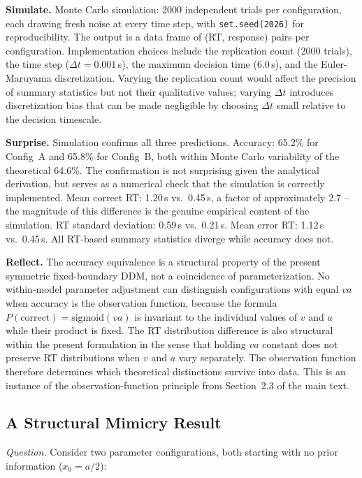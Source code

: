 \documentclass[11pt,a4paper]{article}
\begin{document}
\textbf{Simulate.} Monte Carlo simulation: 2000 independent trials per configuration, each drawing fresh noise at every time step, with \texttt{set.seed(2026)} for reproducibility. The output is a data frame of (RT, response) pairs per configuration. Implementation choices include the replication count (2000 trials), the time step ($\Delta t = 0.001$\,s), the maximum decision time ($6.0$\,s), and the Euler-Maruyama discretization. Varying the replication count would affect the precision of summary statistics but not their qualitative values; varying $\Delta t$ introduces discretization bias that can be made negligible by choosing $\Delta t$ small relative to the decision timescale.

\textbf{Surprise.} Simulation confirms all three predictions. Accuracy: 65.2\% for Config~A and 65.8\% for Config~B, both within Monte Carlo variability of the theoretical 64.6\%. The confirmation is not surprising given the analytical derivation, but serves as a numerical check that the simulation is correctly implemented. Mean correct RT: 1.20\,s vs.\ 0.45\,s, a factor of approximately 2.7 -- the magnitude of this difference is the genuine empirical content of the simulation. RT standard deviation: 0.59\,s vs.\ 0.21\,s. Mean error RT: 1.12\,s vs.\ 0.45\,s. All RT-based summary statistics diverge while accuracy does not.

\textbf{Reflect.} The accuracy equivalence is a structural property of the present symmetric fixed-boundary DDM, not a coincidence of parameterization. No within-model parameter adjustment can distinguish configurations with equal $va$ when accuracy is the observation function, because the formula $P(\text{correct}) = \text{sigmoid}(va)$ is invariant to the individual values of $v$ and $a$ while their product is fixed. The RT distribution difference is also structural within the present formulation in the sense that holding $va$ constant does not preserve RT distributions when $v$ and $a$ vary separately. The observation function therefore determines which theoretical distinctions survive into data. This is an instance of the observation-function principle from Section~2.3 of the main text.

\subsection*{A Structural Mimicry Result}

\emph{Question.} Consider two parameter configurations, both starting with no prior information ($x_0 = a/2$):
\end{document}
